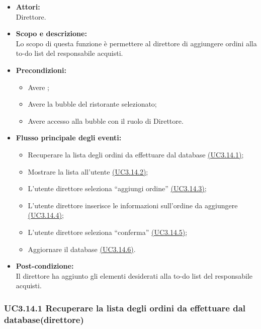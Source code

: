 \begin{itemize}
	\item \textbf{Attori:}
	\\Direttore.
	\item \textbf{Scopo e descrizione:} 
	\\Lo scopo di questa funzione è permettere al direttore di aggiungere ordini alla to-do list del responsabile acquisti.
	\item \textbf{Precondizioni:}
	\begin{itemize}
		\item Avere ;
		\item Avere la bubble del ristorante selezionato;
		\item Avere accesso alla bubble con il ruolo di Direttore.
	\end{itemize}
	\item \textbf{Flusso principale degli eventi:}
	\begin{itemize}
		\item Recuperare la lista degli ordini da effettuare dal database \hyperref[UC3.14.1]{(UC3.14.1)};
		\item Mostrare la lista all’utente \hyperref[UC3.14.2]{(UC3.14.2)};
		\item L’utente direttore seleziona “aggiungi ordine” \hyperref[UC3.14.3]{(UC3.14.3)};
		\item L’utente direttore inserisce le informazioni sull’ordine da aggiungere \hyperref[UC3.14.4]{(UC3.14.4)};
		\item L’utente direttore seleziona “conferma” \hyperref[UC3.14.5]{(UC3.14.5)};
		\item Aggiornare il database \hyperref[UC3.14.6]{(UC3.14.6)}.
	\end{itemize}
	\item \textbf{Post-condizione:}
	\\Il direttore ha aggiunto gli elementi desiderati alla to-do list del responsabile acquisti.
\end{itemize}

\subsubsection{UC3.14.1 Recuperare la lista degli ordini da effettuare dal database(direttore)} \label{UC3.14.1}

